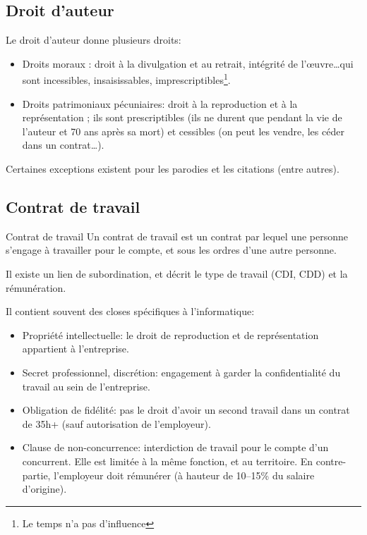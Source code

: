 \documentclass[10pt,a4paper,french]{article}
\begin{document}
\subsection{Droit d'auteur}

Le droit d'auteur donne plusieurs droits:
\begin{itemize}
\item Droits moraux : droit à la divulgation et au retrait, intégrité de l'œuvre\ldots qui sont incessibles, insaisissables, imprescriptibles\footnote{Le temps n'a pas d'influence}.
\item Droits patrimoniaux pécuniaires: droit à la reproduction et à la représentation ; ils sont prescriptibles (ils ne durent que pendant la vie de l'auteur et 70 ans après sa mort) et cessibles (on peut les vendre, les céder dans un contrat\ldots).
\end{itemize}

Certaines exceptions existent pour les parodies et les citations (entre autres).

\subsection{Contrat de travail}
\begin{cquote}{Contrat de travail}
Un contrat de travail est un contrat par lequel une personne s'engage à travailler pour le compte, et sous les ordres d'une autre personne.
\end{cquote}

Il existe un lien de subordination, et décrit le type de travail (CDI, CDD) et la rémunération.

Il contient souvent des closes spécifiques à l'informatique:
\begin{itemize}
\item Propriété intellectuelle: le droit de reproduction et de représentation appartient à l'entreprise.
\item Secret professionnel, discrétion: engagement à garder la confidentialité du travail au sein de l'entreprise.
\item Obligation de fidélité: pas le droit d'avoir un second travail dans un contrat de 35h+ (sauf autorisation de l'employeur).
\item Clause de non-concurrence: interdiction de travail pour le compte d'un concurrent. Elle est limitée à la même fonction, et au territoire. En contre-partie, l'employeur doit rémunérer (à hauteur de 10--15\% du salaire d'origine).
\end{itemize}
\end{document}
